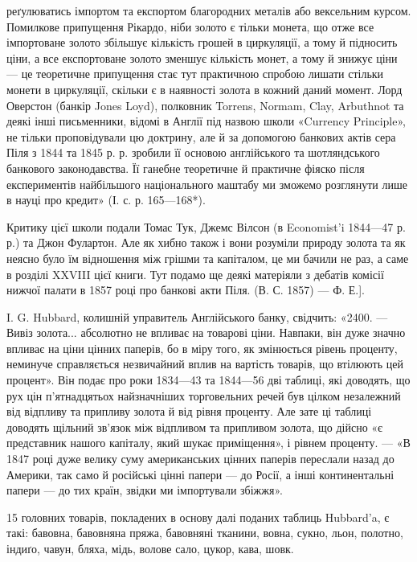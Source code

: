 реґулюватись імпортом та експортом благородних металів або вексельним курсом.
Помилкове припущення Рікардо, ніби золото є тільки монета, що отже все імпортоване
золото збільшує кількість грошей в циркуляції, а тому й підносить ціни,
а все експортоване золото зменшує кількість монет, а тому й знижує ціни —
це теоретичне припущення стає тут практичною спробою лишати стільки
монети в циркуляції, скільки є в наявності золота в кожний даний
момент. Лорд Оверстон (банкір Jones Loyd), полковник Torrens, Normam, Clay,
Arbuthnot та деякі інші письменники, відомі в Англії під назвою школи «Currency
Principle», не тільки проповідували цю доктрину, але й за допомогою банкових
актів сера Піля з 1844 та 1845 р. р. зробили її основою англійського та шотляндського
банкового законодавства. Її ганебне теоретичне й практичне фіяско після
експериментів найбільшого національного маштабу ми зможемо розглянути лише
в науці про кредит» (І. с. р. 165—168*).

Критику цієї школи подали Томас Тук, Джемс Вілсон (в Economist’i 1844—47 р. р.)
та Джон Фулартон. Але як хибно також і вони розуміли природу золота
та як неясно було їм відношення між грішми та капіталом, це ми бачили не
раз, а саме в розділі XXVIII цієї книги. Тут подамо ще деякі матеріяли з дебатів
комісії нижчої палати в 1857 році про банкові акти Піля. (В. С. 1857) — Ф. Е.].

I. G. Hubbard, колишній управитель Англійського банку, свідчить: «2400. —
Вивіз золота... абсолютно не впливає на товарові ціни. Навпаки, він дуже
значно впливає на ціни цінних паперів, бо в міру того, як змінюється рівень
проценту, неминуче справляється незвичайний вплив на вартість товарів, що втілюють
цей процент». Він подає про роки 1834—43 та 1844—56 дві таблиці,
які доводять, що рух цін п’ятнадцятьох найзначніших торговельних речей був
цілком незалежний від відпливу та припливу золота й від рівня проценту. Але
зате ці таблиці доводять щільний зв’язок між відпливом та припливом золота,
що дійсно «є представник нашого капіталу, який шукає приміщення», і рівнем
проценту. — «В 1847 році дуже велику суму американських цінних паперів переслали
назад до Америки, так само й російські цінні папери — до Росії, а інші
континентальні папери — до тих країн, звідки ми імпортували збіжжя».

15 головних товарів, покладених в основу далі поданих таблиць Hubbard’a,
є такі: бавовна, бавовняна пряжа, бавовняні тканини, вовна, сукно,
льон, полотно, індиґо, чавун, бляха, мідь, волове сало, цукор, кава, шовк.

